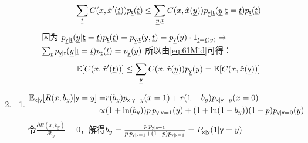 \documentclass[a4paper]{article}
\begin{document}
\begin{enumerate}[label=\thehwcnt.\arabic*.]
\begin{enumerate}[label=(\alph*)]
\begin{enumerate}[label=\roman*.]
\begin{equation}
    \sum_{\underline{t}} C(x,\hat{x}'(\underline{t}))p_{\underline{\mathsf{t}}}(\underline{t}) 
    \leq  \sum_{\underline{y},\underline{t}} C(x,\hat{x}(\underline{y})) 
    p_{\underline{\mathsf{y}}| \underline{\mathsf{t}}}(\underline{y}|\underline{\mathsf{t}}=\underline{t})p_{\underline{\mathsf{t}}}(\underline{t}) 
    \end{equation}
   因为
   $ p_{\underline{\mathsf{y}}| \underline{\mathsf{t}}}(\underline{y}|\underline{\mathsf{t}}=\underline{t})p_{\underline{\mathsf{t}}}(\underline{t}) 
   = p_{\underline{\mathsf{y}},\underline{\mathsf{t}}}(\mathsf{y},\underline{t})=p_{\underline{\mathsf{y}}}(y)\cdot 1_{\underline{t}=\underline{t}(y)} \Rightarrow$
   $\sum_{\underline{t}} p_{\underline{\mathsf{y}}| \mathsf{t}}(\underline{y}|\underline{\mathsf{t}}=\underline{t})p_{\underline{\mathsf{t}}}(\underline{t})
   =p_{\underline{\mathsf{y}}}(y) $
   所以由\eqref{eq:61Mid}可得：
   \[
   \operatorname{\mathbb{E}}[C(x,\hat{x}'(\underline{\mathsf{t}}))]\leq \sum_{\underline{y}} C(x,\hat{x}(\underline{y})) 
    p_{\underline{\mathsf{y}}}(y)
    =\operatorname{\mathbb{E}}[C(x,\hat{x}(\underline{\mathsf{y}}))]
   \]
   
   \end{enumerate}
  
   \end{enumerate}
  
  \item 
  \begin{enumerate}[label=(\alph*)]
  \item 
   \begin{align*} 
      \operatorname{\mathbb{E}}_{\mathsf{x}|\mathsf{y}}[R(x,b_y)|\mathsf{y}=y] = & r(b_y)p_{\mathsf{x}|\mathsf{y}=y}(x=1)+r(1-b_y)p_{\mathsf{x}|\mathsf{y}=y}(x=0) \\
      \propto & (1+\ln(b_y))p\, p_{\mathsf{y}| \mathsf{x}=1}(y)+(1+\ln(1-b_y))(1-p) p_{\mathsf{y}| \mathsf{x}=0}(y)
   \end{align*}
   令$\frac{\partial R(x,b_y)}{\partial b_y}=0$，解得$b_y=
   \frac{p\,p_{\mathsf{y}| \mathsf{x}=1}}{p\,p_{\mathsf{y}| \mathsf{x}=1}+(1-p)p_{\mathsf{y}| \mathsf{x}=1}}=P_{\mathsf{x}|\mathsf{y}}(1|\mathsf{y}=y)$


\end{enumerate}
\end{enumerate}
\end{document}
